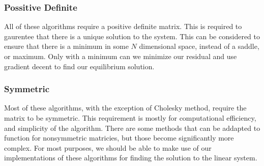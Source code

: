 \documentclass[../fem.tex]{subfiles}
\begin{document}
\begin{Figure}
   \begin{center}
     
   \end{center}
\end{Figure}

\subsubsection{Possitive Definite}%
\label{ssub:possitive_definite}

All of these algorithms require a positive definite matrix. This is required to
gaurentee that there is a unique solution to the system. This can be considered
to ensure that there is a minimum in some $N$ dimensional space, instead of a
saddle, or maximum. Only with a minimum can we minimize our residual and use
gradient decent to find our equilibrium solution.

\subsubsection{Symmetric}%
\label{ssub:symmetric}

Most of these algorithms, with the exception of Cholesky method, require the
matrix to be symmetric. This requirement is mostly for computational
efficiency, and simplicity of the algorithm. There are some methods that can be
addapted to function for nonsymmetric matricies, but those become significantly
more complex. For most purposes, we should be able to make use of our
implementations of these algorithms for finding the solution to the linear
system.
\end{document}
